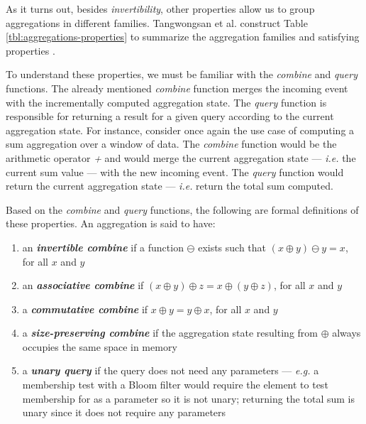 As it turns out, besides \textit{invertibility}, other properties allow us to group aggregations in different families. Tangwongsan et al. construct Table \ref{tbl:aggregations-properties} to summarize the aggregation families and satisfying properties \cite{Tangwongsan-Sliding-Window-Aggregation-Algorithms}.

To understand these properties, we must be familiar with the \textit{combine} and \textit{query} functions. The already mentioned \textit{combine} function merges the incoming event with the incrementally computed aggregation state. The \textit{query} function is responsible for returning a result for a given query according to the current aggregation state. For instance, consider once again the use case of computing a sum aggregation over a window of data. The \textit{combine} function would be the arithmetic operator \textit{+} and would merge the current aggregation state --- \textit{i.e.} the current sum value --- with the new incoming event. The \textit{query} function would return the current aggregation state --- \textit{i.e.} return the total sum computed.


Based on the \textit{combine} and \textit{query} functions, the following are formal definitions of these properties. An aggregation is said to have:

\begin{enumerate}
    \item  an \textbf{\textit{invertible combine}} if a function $\ominus$ exists such that $(x \oplus y) \ominus y = x$, for all $x$ and $y$
    
    \item  an \textbf{\textit{associative combine}} if $(x \oplus y) \oplus z = x \oplus (y \oplus z)$, for all $x$ and $y$
    
    \item  a \textbf{\textit{commutative combine}} if $x \oplus y = y \oplus x$, for all $x$ and $y$
    
    \item  a \textbf{\textit{size-preserving combine}} if the aggregation state resulting from $\oplus$ always occupies the same space in memory
   
    \item  a \textbf{\textit{unary query}} if the query does not need any parameters --- \textit{e.g.} a membership test with a Bloom filter would require the element to test membership for as a parameter so it is not unary; returning the total sum is unary since it does not require any parameters
\end{enumerate}


